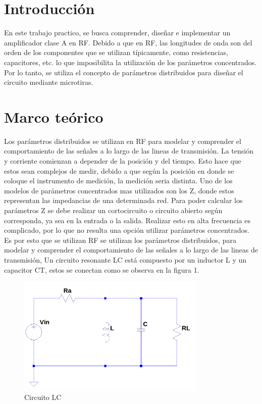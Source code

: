 \section{Introducción}

\hspace{1mm} En este trabajo practico, se busca comprender, diseñar e implementar un amplificador clase A en RF. Debido a que en RF, las longitudes de onda son del orden de los componentes que se utilizan típicamente, como resistencias, capacitores, etc. lo que imposibilita la utilización de los parámetros concentrados. Por lo tanto, se utiliza el concepto de parámetros distribuidos para diseñar el circuito mediante microtiras.

\section{Marco teórico}
\hspace{1mm} Los parámetros distribuidos se utilizan en RF para modelar y comprender el comportamiento de las señales a lo largo de las lineas de transmisión. La tensión y corriente comienzan a depender de la posición y del tiempo. %
Esto hace que estos sean complejos de medir, debido a que según la posición en donde se coloque el instrumento de medición, la medición seria distinta. Uno de los modelos de parámetros concentrados mas utilizados son los Z, donde estos representan las impedancias de una determinada red. Para poder calcular los parámetros Z se debe realizar un cortocircuito o circuito abierto según corresponda, ya sea en la entrada o la salida. Realizar esto en alta frecuencia es complicado, por lo que no resulta una opción utilizar parámetros concentrados.
Es por esto que se utilizan  RF se utilizan los parámetros distribuidos, para modelar y comprender el comportamiento de las señales a lo largo de las lineas de transmisión,
Un circuito resonante LC está compuesto por un inductor L y un capacitor CT, estos se conectan como se observa en la figura 1.

\begin{figure}[!h]
    \centering
    \includegraphics[width=0.8\textwidth]{Imagenes/LC.png}
    \caption{Circuito LC}
    \label{fig:LC}
\end{figure}

